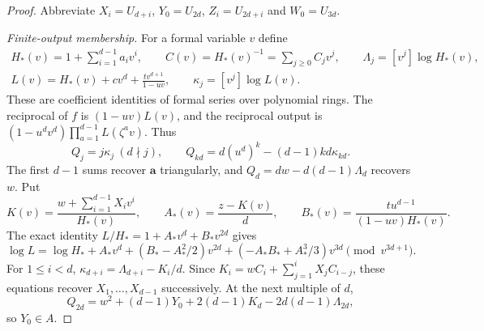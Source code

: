 \documentclass[10pt,fleqn]{article}
\numberwithin{equation}{section}
\begin{document}
\begin{proof}
Abbreviate $X_i=U_{d+i}$, $Y_0=U_{2d}$, $Z_i=U_{2d+i}$ and $W_0=U_{3d}$.

\textit{Finite-output membership.}
For a formal variable $v$ define
\[
 \begin{gathered}
 H_*(v)=1+\sum_{i=1}^{d-1}a_iv^i,\qquad
 C(v)=H_*(v)^{-1}=\sum_{j\ge0}C_jv^j,\qquad
 \Lambda_j=[v^j]\log H_*(v),\\
 L(v)=H_*(v)+cv^d+\frac{tv^{d+1}}{1-uv},\qquad
 \kappa_j=[v^j]\log L(v).
 \end{gathered}
\]
These are coefficient identities of formal series over polynomial rings.
The reciprocal of $f$ is $(1-uv)L(v)$, and the reciprocal output is
$(1-u^dv^d)\prod_{a=1}^{d-1}L(\zeta^a v)$.  Thus
\[
 Q_j=j\kappa_j\ (d\nmid j),\qquad
 Q_{kd}=d(u^d)^k-(d-1)kd\kappa_{kd}.
\]
The first $d-1$ sums recover $\mathbf a$ triangularly, and
$Q_d=dw-d(d-1)\Lambda_d$ recovers $w$.
Put
\[
 K(v)=\frac{w+\sum_{i=1}^{d-1}X_iv^i}{H_*(v)},\qquad
 A_*(v)=\frac{z-K(v)}d,\qquad
 B_*(v)=\frac{tu^{d-1}}{(1-uv)H_*(v)}.
\]
The exact identity $L/H_*=1+A_*v^d+B_*v^{2d}$ gives
\[
 \log L=\log H_*+A_*v^d+(B_*-A_*^2/2)v^{2d}
                    +(-A_*B_*+A_*^3/3)v^{3d}\pmod{v^{3d+1}}.
\]
For $1\le i<d$, $\kappa_{d+i}=\Lambda_{d+i}-K_i/d$.
Since $K_i=wC_i+\sum_{j=1}^iX_jC_{i-j}$, these equations recover
$X_1,\ldots,X_{d-1}$ successively.  At the next multiple of $d$,
\[
 Q_{2d}=w^2+(d-1)Y_0+2(d-1)K_d-2d(d-1)\Lambda_{2d},
\]
so $Y_0\in A$.


\end{proof}
\end{document}
